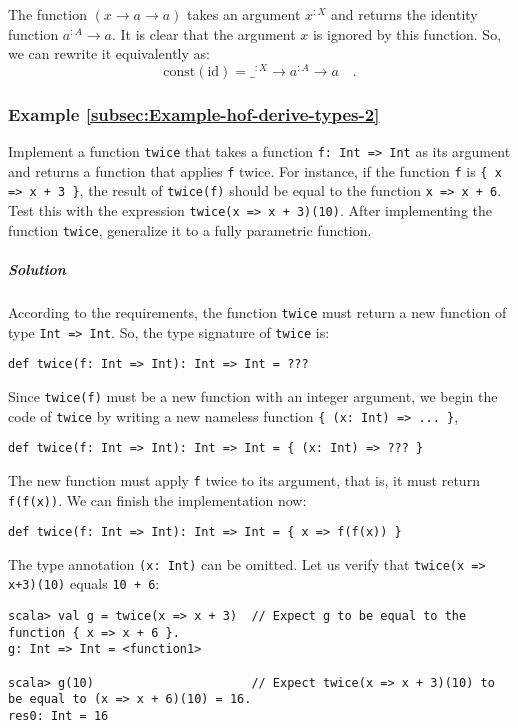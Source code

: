 The function $\left(x\rightarrow a\rightarrow a\right)$ takes an
argument $x^{:X}$ and returns the identity function $a^{:A}\rightarrow a$.
It is clear that the argument $x$ is ignored by this function. So,
we can rewrite it equivalently as:
\[
\text{const}\left(\text{id}\right)=\_^{:X}\rightarrow a^{:A}\rightarrow a\quad.
\]


\subsubsection{Example \label{subsec:Example-hof-derive-types-2}\ref{subsec:Example-hof-derive-types-2}}

Implement a function \lstinline!twice! that takes a function \lstinline!f: Int => Int!
as its argument and returns a function that applies \lstinline!f!
twice. For instance, if the function \lstinline!f! is \lstinline!{ x => x + 3 }!,
the result of \lstinline!twice(f)! should be equal to the function
\lstinline!x => x + 6!. Test this with the expression \lstinline!twice(x => x + 3)(10)!.
After implementing the function \lstinline!twice!, generalize it
to a fully parametric function.

\subparagraph{Solution}

According to the requirements, the function \lstinline!twice! must
return a new function of type \lstinline!Int => Int!. So, the type
signature of \lstinline!twice! is:
\begin{lstlisting}
def twice(f: Int => Int): Int => Int = ???
\end{lstlisting}
Since \lstinline!twice(f)! must be a new function with an integer
argument, we begin the code of \lstinline!twice! by writing a new
nameless function \lstinline!{ (x: Int) => ... }!,
\begin{lstlisting}
def twice(f: Int => Int): Int => Int = { (x: Int) => ??? }
\end{lstlisting}
The new function must apply \lstinline!f! twice to its argument,
that is, it must return \lstinline!f(f(x))!. We can finish the implementation
now:
\begin{lstlisting}
def twice(f: Int => Int): Int => Int = { x => f(f(x)) }
\end{lstlisting}
The type annotation \lstinline!(x: Int)! can be omitted. Let us verify
that \lstinline!twice(x => x+3)(10)! equals \lstinline!10 + 6!:
\begin{lstlisting}
scala> val g = twice(x => x + 3)  // Expect g to be equal to the function { x => x + 6 }.
g: Int => Int = <function1>

scala> g(10)                      // Expect twice(x => x + 3)(10) to be equal to (x => x + 6)(10) = 16.
res0: Int = 16
\end{lstlisting}


